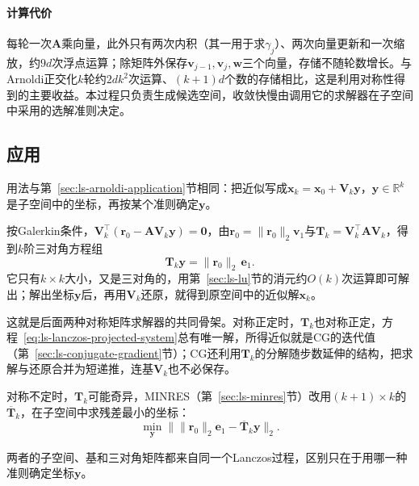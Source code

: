 \paragraph{计算代价}
每轮一次$\bm A$乘向量，此外只有两次内积（其一用于求$\gamma_j$）、两次向量更新和一次缩放，约$9d$次浮点运算；除矩阵外保存$\bm v_{j-1},\bm v_j,\bm w$三个向量，存储不随轮数增长。与Arnoldi正交化$k$轮约$2dk^2$次运算、$(k+1)d$个数的存储相比，这是利用对称性得到的主要收益。本过程只负责生成候选空间，收敛快慢由调用它的求解器在子空间中采用的选解准则决定。

\subsection{应用}
\label{sec:ls-lanczos-application}

用法与第~\ref{sec:ls-arnoldi-application}节相同：把近似写成$\bm x_k=\bm x_0+\bm V_k\bm y$，$\bm y\in\mathbb R^k$是子空间中的坐标，再按某个准则确定$\bm y$。

按Galerkin条件，$\bm V_k^\top(\bm r_0-\bm A\bm V_k\bm y)=\bm0$，由$\bm r_0=\lVert\bm r_0\rVert_2\bm v_1$与$\bm T_k=\bm V_k^\top\bm A\bm V_k$，得到$k$阶三对角方程组
\begin{equation}
 \bm T_k\bm y=\lVert\bm r_0\rVert_2\,\bm e_1 .
 \label{eq:ls-lanczos-projected-system}
\end{equation}
它只有$k\times k$大小，又是三对角的，用第~\ref{sec:ls-lu}节的消元约$O(k)$次运算即可解出；解出坐标$\bm y$后，再用$\bm V_k$还原，就得到原空间中的近似解$\bm x_k$。

这就是后面两种对称矩阵求解器的共同骨架。对称正定时，$\bm T_k$也对称正定，方程~\eqref{eq:ls-lanczos-projected-system}总有唯一解，所得近似就是CG的迭代值（第~\ref{sec:ls-conjugate-gradient}节）；CG还利用$\bm T_k$的分解随步数延伸的结构，把求解与还原合并为短递推，连基$\bm V_k$也不必保存。

对称不定时，$\bm T_k$可能奇异，MINRES（第~\ref{sec:ls-minres}节）改用$(k+1)\times k$的$\overline{\bm T}_k$，在子空间中求残差最小的坐标：
\begin{equation}
 \min_{\bm y}\bigl\lVert\lVert\bm r_0\rVert_2\bm e_1-\overline{\bm T}_k\bm y\bigr\rVert_2 .
 \label{eq:ls-lanczos-minimal-residual-problem}
\end{equation}

两者的子空间、基和三对角矩阵都来自同一个Lanczos过程，区别只在于用哪一种准则确定坐标$\bm y$。
